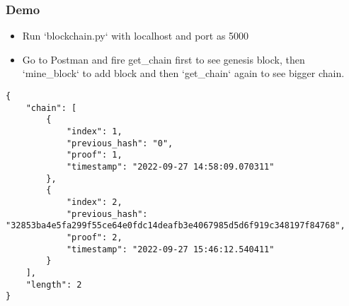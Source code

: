 \begin{frame}[fragile]\frametitle{Demo}
\begin{itemize}
\item Run `blockchain.py` with localhost and port as 5000
\item Go to Postman and fire get\_chain first to see genesis block, then `mine\_block` to add block and then `get\_chain` again to see bigger chain.
\end{itemize}
\begin{lstlisting}
{
    "chain": [
        {
            "index": 1,
            "previous_hash": "0",
            "proof": 1,
            "timestamp": "2022-09-27 14:58:09.070311"
        },
        {
            "index": 2,
            "previous_hash": "32853ba4e5fa299f55ce64e0fdc14deafb3e4067985d5d6f919c348197f84768",
            "proof": 2,
            "timestamp": "2022-09-27 15:46:12.540411"
        }
    ],
    "length": 2
}
\end{lstlisting}

\end{frame}